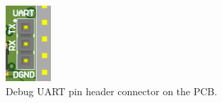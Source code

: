 \begin{figure}[!ht]
    \begin{center}
        \includegraphics[width=0.15\textwidth]{figures/uart-pin-header-3d.png}
        \caption{Debug UART pin header connector on the PCB.}
        \label{fig:uart-pin-header}
    \end{center}
\end{figure}